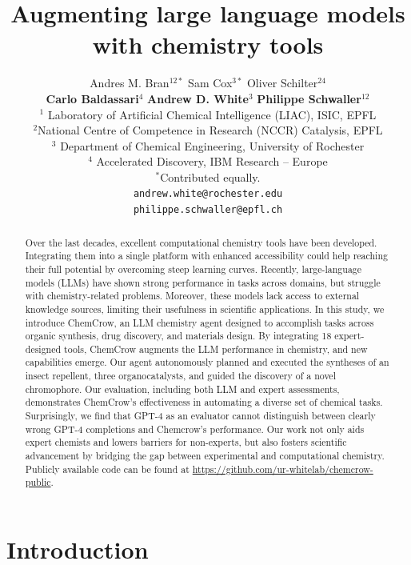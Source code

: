\documentclass[10pt]{article}
\title{Augmenting large language models with chemistry tools}
\author{
Andres M. Bran$^{12*}$ \quad Sam Cox$^{3*}$ \quad Oliver Schilter$^{24}$ \\ 
\textbf{Carlo Baldassari}$^{4}$ \quad \textbf{Andrew D. White}$^{3}$ \quad \textbf{Philippe Schwaller}$^{12}$  \\
$^1$ Laboratory of Artificial Chemical Intelligence (LIAC), ISIC, EPFL\\ 
$^2$National Centre of Competence in Research (NCCR) Catalysis, EPFL\\ 
$^3$ Department of Chemical Engineering,  University of Rochester\\
$^4$ Accelerated Discovery, IBM Research -- Europe \\
$^*$Contributed equally.\\
\texttt{andrew.white@rochester.edu}\\
\texttt{philippe.schwaller@epfl.ch}\\
}
\begin{document}
\maketitle
\begin{abstract}
Over the last decades, excellent computational chemistry tools have been developed. Integrating them into a single platform with enhanced accessibility could help reaching their full potential by overcoming steep learning curves. Recently, large-language models (LLMs) have shown strong performance in tasks across domains, but struggle with chemistry-related problems. Moreover, these models lack access to external knowledge sources, limiting their usefulness in scientific applications. In this study, we introduce ChemCrow, an LLM chemistry agent designed to accomplish tasks across organic synthesis, drug discovery, and materials design. By integrating 18 expert-designed tools, ChemCrow augments the LLM performance in chemistry, and new capabilities emerge. Our agent autonomously planned and executed the syntheses of an insect repellent, three organocatalysts, and guided the discovery of a novel chromophore. Our evaluation, including both LLM and expert assessments, demonstrates ChemCrow's effectiveness in automating a diverse set of chemical tasks. Surprisingly, we find that GPT-4 as an evaluator cannot distinguish between clearly wrong GPT-4 completions and Chemcrow's performance. Our work not only aids expert chemists and lowers barriers for non-experts, but also fosters scientific advancement by bridging the gap between experimental and computational chemistry. Publicly available code can be found at \url{https://github.com/ur-whitelab/chemcrow-public}.


\end{abstract}

\section{Introduction}
\end{document}
